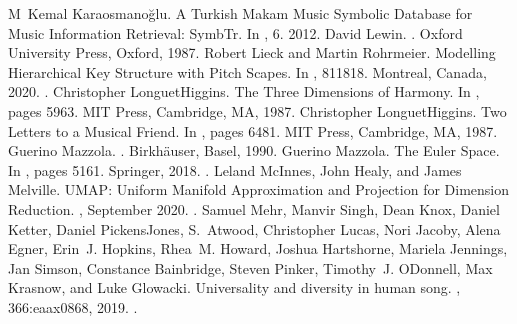 \documentclass[letterpaper,10pt,english]{sphinxmanual}
\begin{document}
\begin{sphinxthebibliography}{10}
\sphinxAtStartPar
M Kemal Karaosmanoğlu. A Turkish Makam Music Symbolic Database for Music Information Retrieval: SymbTr. In , 6. 2012.
\sphinxAtStartPar
David Lewin. . Oxford University Press, Oxford, 1987.
\sphinxAtStartPar
Robert Lieck and Martin Rohrmeier. Modelling Hierarchical Key Structure with Pitch Scapes. In , 811\textendash{}818. Montreal, Canada, 2020. .
\sphinxAtStartPar
Christopher Longuet\sphinxhyphen{}Higgins. The Three Dimensions of Harmony. In , pages 59\textendash{}63. MIT Press, Cambridge, MA, 1987.
\sphinxAtStartPar
Christopher Longuet\sphinxhyphen{}Higgins. Two Letters to a Musical Friend. In , pages 64\textendash{}81. MIT Press, Cambridge, MA, 1987.
\sphinxAtStartPar
Guerino Mazzola. . Birkhäuser, Basel, 1990.
\sphinxAtStartPar
Guerino Mazzola. The Euler Space. In , pages 51\textendash{}61. Springer, 2018. .
\sphinxAtStartPar
Leland McInnes, John Healy, and James Melville. UMAP: Uniform Manifold Approximation and Projection for Dimension Reduction. , September 2020. .
\sphinxAtStartPar
Samuel Mehr, Manvir Singh, Dean Knox, Daniel Ketter, Daniel Pickens\sphinxhyphen{}Jones, S. Atwood, Christopher Lucas, Nori Jacoby, Alena Egner, Erin J. Hopkins, Rhea M. Howard, Joshua Hartshorne, Mariela Jennings, Jan Simson, Constance Bainbridge, Steven Pinker, Timothy J. O\textquotesingle{}Donnell, Max Krasnow, and Luke Glowacki. Universality and diversity in human song. , 366:eaax0868, 2019. .

\end{sphinxthebibliography}
\end{document}
